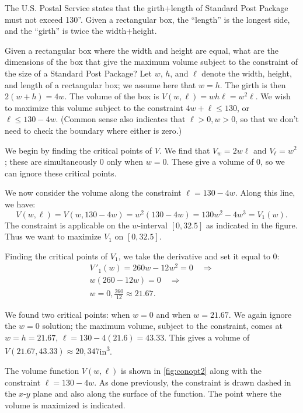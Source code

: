 \begin{example}\label{ex_conopt2}%
The U.S. Postal Service states that the girth+length of Standard Post Package must not exceed 130''. Given a rectangular box, the ``length'' is the longest side, and the ``girth'' is twice the width+height.

Given a rectangular box where the width and height are equal, what are the dimensions of the box that give the maximum volume subject to the constraint of the size of a Standard Post Package?
\solution
Let $w$, $h$, and $\ell$ denote the width, height, and length of a rectangular box; we assume here that $w=h$. The girth is then $2(w+h) = 4w$. The volume of the box is $V(w,\ell) = wh\ell = w^2\ell$. We wish to maximize this volume subject to the constraint $4w+\ell\leq 130$, or $\ell\leq 130-4w$. (Common sense also indicates that $\ell>0, w>0$, so that we don't need to check the boundary where either is zero.)

We begin by finding the critical points of $V$. We find that $V_w = 2w\ell$ and $V_\ell = w^2$; these are simultaneously 0 only when $w=0$. These give a volume of 0, so we can ignore these critical points. 

We now consider the volume along the constraint $\ell=130-4w.$ Along this line, we have:
\[V(w,\ell) = V(w,130-4w) = w^2(130-4w) = 130w^2-4w^3 = V_1(w).\]
The constraint is applicable on the $w$-interval $[0,32.5]$ as indicated in the figure. Thus we want to maximize $V_1$ on $[0,32.5]$. 

Finding the critical points of $V_1$, we take the derivative and set it equal to 0:
\begin{multline*}
 V\,'_1(w) = 260w-12w^2 = 0 \quad \Rightarrow \\
 w(260-12w)= 0 \quad \Rightarrow \\
 w=0,\frac{260}{12}\approx 21.67.
\end{multline*}

We found two critical points: when $w=0$ and when $w=21.67$. We again ignore the $w=0$ solution; the maximum volume, subject to the constraint, comes at $w=h=21.67$, $\ell = 130-4(21.6) =43.33.$ This gives a volume of $V(21.67,43.33) \approx 20{,}347$in\textsuperscript3. 


The volume function $V(w,\ell)$ is shown in \autoref{fig:conopt2} along with the constraint $\ell = 130-4w$. As done previously, the constraint is drawn dashed in the $x$-$y$ plane and also along the surface of the function. The point where the volume is maximized is indicated.
\end{example}

